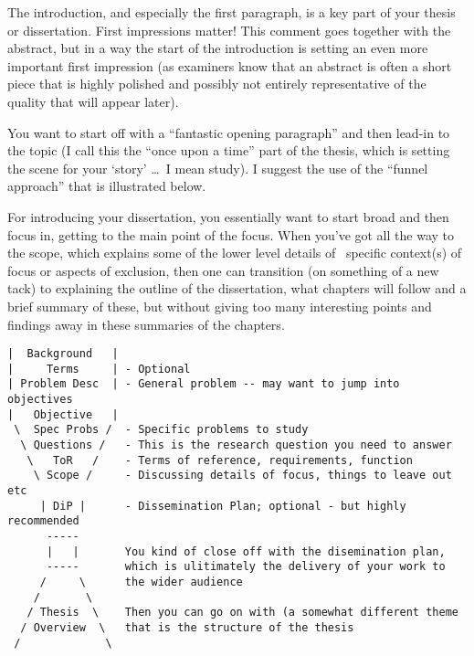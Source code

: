 

The introduction, and especially the first paragraph, is a key part of your thesis or dissertation.  First impressions matter!  This comment goes together with the abstract, but in a way the start of the introduction is setting an even more important first impression (as examiners know that an abstract is often a short piece that is highly polished and possibly not entirely representative of the quality that will appear later).

You want to start off with a ``fantastic opening paragraph'' and then lead-in to the topic (I call this the ``once upon a time'' part of the thesis, which is setting the scene for your `story' \ldots\ I mean study). I suggest the use of the ``funnel approach'' that is illustrated below.

For introducing your dissertation, you essentially want to start broad and then focus in, getting to the main point of the focus.  When you've got all the way to the scope, which explains some of the lower level details of \eg~specific context(s) of focus or aspects of exclusion, then one can transition (on something of a new tack) to explaining the outline of the dissertation, what chapters will follow and a brief summary of these, but without giving too many interesting points and findings away in these summaries of the chapters.

\begin{minipage}[t]{\textwidth}
\begin{verbatim}
|  Background   |
|     Terms     | - Optional
| Problem Desc  | - General problem -- may want to jump into objectives
|   Objective   |
 \  Spec Probs /  - Specific problems to study
  \ Questions /   - This is the research question you need to answer
   \   ToR   /    - Terms of reference, requirements, function
    \ Scope /     - Discussing details of focus, things to leave out etc
     | DiP |      - Dissemination Plan; optional - but highly recommended
      -----
      |   |       You kind of close off with the disemination plan,
      -----       which is ulitimately the delivery of your work to
     /     \      the wider audience
    /       \
   / Thesis  \    Then you can go on with (a somewhat different theme
  / Overview  \   that is the structure of the thesis
 /             \
\end{verbatim}
\end{minipage}

